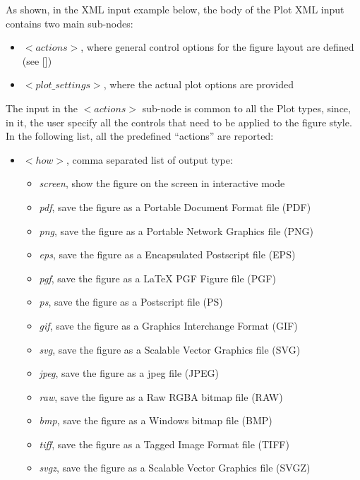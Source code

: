As shown, in the XML input example below, the body of the Plot XML input contains two main sub-nodes:
\vspace{-5mm}
\begin{itemize}
\itemsep0em
\item$<actions>$, where general control options for the figure layout are defined (see [])
\item $<plot\_settings>$, where the actual plot options are provided
\vspace{-5mm}
\end{itemize}
The input in the $<actions>$ sub-node is common to all the Plot types, since, in it, the user specify all the controls that need to be applied to the figure style. In the following list, all the predefined ``actions'' are reported:
 \vspace{-5mm}
\begin{itemize}
\itemsep0em
\item $<how>$, comma separated list of output type:
     \begin{itemize}
        \item \textit{screen}, show the figure on the screen in interactive mode
        \item \textit{pdf}, save the figure as a Portable Document Format file (PDF)
        \item \textit{png}, save the figure as a Portable Network Graphics file (PNG)
        \item \textit{eps}, save the figure as a Encapsulated Postscript file (EPS)
        \item \textit{pgf}, save the figure as a LaTeX PGF Figure file (PGF)
        \item \textit{ps}, save the figure as a Postscript file (PS)
        \item \textit{gif}, save the figure as a Graphics Interchange Format (GIF)
        \item \textit{svg}, save the figure as a Scalable Vector Graphics file (SVG)
        \item \textit{jpeg}, save the figure as a jpeg file (JPEG)
        \item \textit{raw}, save the figure as a Raw RGBA bitmap file (RAW)
        \item \textit{bmp}, save the figure as a Windows bitmap file (BMP)
        \item \textit{tiff}, save the figure as a Tagged Image Format  file (TIFF)
        \item \textit{svgz}, save the figure as a Scalable Vector Graphics file (SVGZ)

\end{itemize}
\end{itemize}

